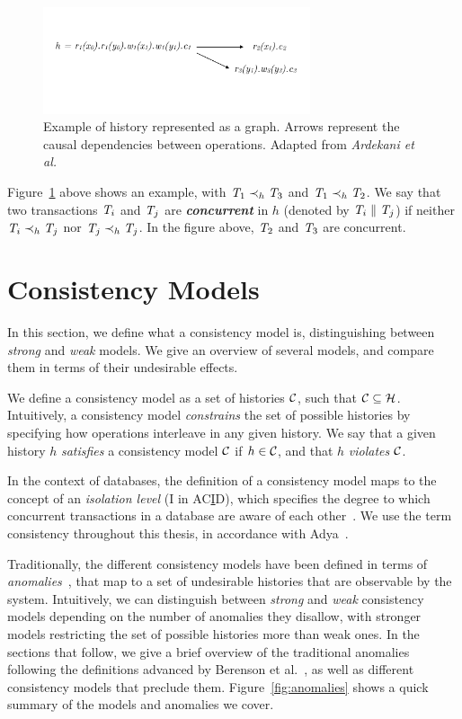 \begin{figure}[h]
  \centering
  \vspace{-0.4cm}
  \includegraphics[width=0.7\textwidth]{figures/history.pdf}
  \vspace{-1cm}
  \caption{Example of history represented as a graph. Arrows represent the causal dependencies between operations. Adapted from \em{Ardekani et al.~\citep{ardekani-nsmi}}}
  \label{fig:history}
\end{figure}

Figure~\ref{fig:history} above shows an example, with $\mathit{T}_1 \prec_h \mathit{T}_3$ and $\mathit{T}_1 \prec_h \mathit{T}_2$. We say that two transactions $\mathit{T}_i$ and $\mathit{T}_j$ are \textbf{\em concurrent} in $h$ (denoted by $\mathit{T}_i \parallel \mathit{T}_j$) if neither $\mathit{T}_i \prec_h \mathit{T}_j$ nor $\mathit{T}_j \prec_h \mathit{T}_j$. In the figure above, $\mathit{T}_2$ and $\mathit{T}_3$ are concurrent.

\section{Consistency Models}

In this section, we define what a consistency model is, distinguishing between \emph{strong} and \emph{weak} models. We give an overview of several models, and compare them in terms of their undesirable effects.

We define a consistency model as a set of histories $\mathcal{C}$, such that $\mathcal{C} \subseteq \mathcal{H}$. Intuitively, a consistency model \emph{constrains} the set of possible histories by specifying how operations interleave in any given history. We say that a given history $h$ \emph{satisfies} a consistency model $\mathcal{C}$ if $h \in \mathcal{C}$, and that $h$ \emph{violates} $\mathcal{C}$.

In the context of databases, the definition of a consistency model maps to the concept of an \emph{isolation level} (I in AC\underline{I}D), which specifies the degree to which concurrent transactions in a database are aware of each other~\citep{adya_thesis}. We use the term consistency throughout this thesis, in accordance with Adya~\citep{adya_thesis}.

Traditionally, the different consistency models have been defined in terms of \emph{anomalies}~\citep{sql-critique}, that map to a set of undesirable histories that are observable by the system. Intuitively, we can distinguish between \emph{strong} and \emph{weak} consistency models depending on the number of anomalies they disallow, with stronger models restricting the set of possible histories more than weak ones. In the sections that follow, we give a brief overview of the traditional anomalies following the definitions advanced by Berenson et al.~\citep{sql-critique}, as well as different consistency models that preclude them. Figure~\ref{fig:anomalies} shows a quick summary of the models and anomalies we cover.

